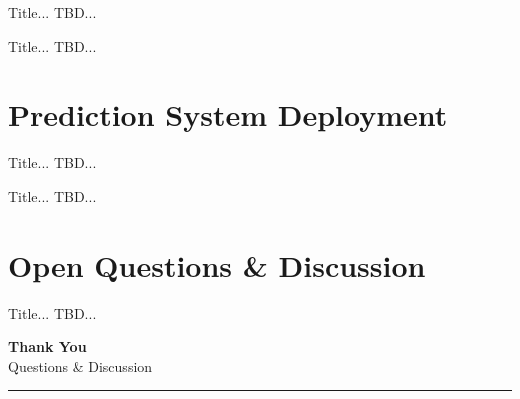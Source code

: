 \documentclass[11pt,aspectratio=169]{beamer}
\begin{document}
\begin{frame}{Title...}
    TBD...
\end{frame}

\begin{frame}{Title...}
    TBD...
\end{frame}

\section{Prediction System Deployment}

\begin{frame}{Title...}
    TBD...
\end{frame}

\begin{frame}{Title...}
    TBD...
\end{frame}


\section{Open Questions \& Discussion}

\begin{frame}{Title...}
    TBD...
\end{frame}

\begin{frame}[noframenumbering]{}
  \begin{center}
    \vspace{0.8cm}
    {\huge \textbf{Thank You}}\\[0.4cm]
    {\large Questions \& Discussion}\\[0.8cm]
    \rule{0.65\textwidth}{0.4pt}\\[0.3cm]
  \end{center}
\end{frame}
\end{document}
